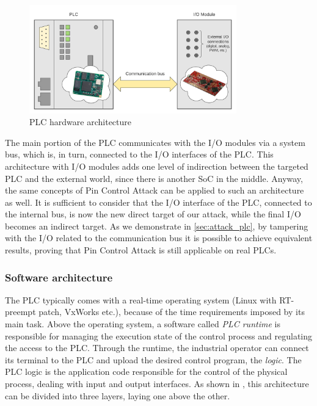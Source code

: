 \begin{figure}[h]
\centerline{\includegraphics[width=0.8\textwidth]{res/plc_arch}}
\caption{PLC hardware architecture \label{fig:plc_arch}}
\end{figure}

The main portion of the PLC communicates with the I/O modules via a system bus, which is, in turn, connected to the I/O interfaces of the PLC.
This architecture with I/O modules adds one level of indirection between the targeted PLC and the external world, since there is another SoC in the middle.
Anyway, the same concepts of Pin Control Attack can be applied to such an architecture as well. It is sufficient to consider that the I/O interface of the PLC,
connected to the internal bus, is now the new direct target of our attack, while the final I/O becomes an indirect target. As we demonstrate in \sec \ref{sec:attack_plc},
by tampering with the I/O related to the communication bus it is possible to achieve equivalent results, proving that Pin Control Attack is still applicable on real PLCs.


\subsubsection{Software architecture}

The PLC typically comes with a real-time operating system (\eg Linux with RT-preempt patch, VxWorks etc.), because of the time requirements imposed by its main task.
Above the operating system, a software called \emph{PLC runtime} is responsible for managing the execution state of the control process and regulating the access to the PLC.
Through the runtime, the industrial operator can connect its terminal to the PLC and upload the desired control program, the \emph{logic}.
The PLC logic is the application code responsible for the control of the physical process, dealing with input and output interfaces.
As shown in \myfig{\ref{fig:plc_swarch}}, this architecture can be divided into three layers, laying one above the other.

